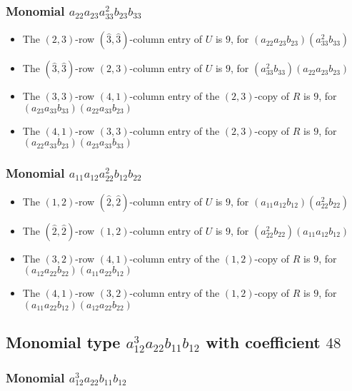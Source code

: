 \documentclass{article}
\begin{document}
\subsubsection{Monomial $ a_{22} a_{23} a_{33}^{2} b_{23} b_{33} $}

\begin{itemize}
\item The $ \left(2, 3\right) $-row $ (\hat{3}, \hat{3}) $-column entry of $U$ is $ 9 $, for $( a_{22} a_{23} b_{23} )( a_{33}^{2} b_{33} )$ 
\item The $(\hat{3}, \hat{3})$-row $ \left(2, 3\right) $-column entry of $U$ is $ 9 $, for $( a_{33}^{2} b_{33} )( a_{22} a_{23} b_{23} )$ 
\item The $(3, 3)$-row $(4, 1)$-column entry of the $ \left(2, 3\right) $-copy of $R$ is $ 9 $, for $( a_{23} a_{33} b_{33} )( a_{22} a_{33} b_{23} )$ 
\item The $(4, 1)$-row $(3, 3)$-column entry of the $ \left(2, 3\right) $-copy of $R$ is $ 9 $, for $( a_{22} a_{33} b_{23} )( a_{23} a_{33} b_{33} )$ 
\end{itemize}
\subsubsection{Monomial $ a_{11} a_{12} a_{22}^{2} b_{12} b_{22} $}

\begin{itemize}
\item The $ \left(1, 2\right) $-row $ (\hat{2}, \hat{2}) $-column entry of $U$ is $ 9 $, for $( a_{11} a_{12} b_{12} )( a_{22}^{2} b_{22} )$ 
\item The $(\hat{2}, \hat{2})$-row $ \left(1, 2\right) $-column entry of $U$ is $ 9 $, for $( a_{22}^{2} b_{22} )( a_{11} a_{12} b_{12} )$ 
\item The $(3, 2)$-row $(4, 1)$-column entry of the $ \left(1, 2\right) $-copy of $R$ is $ 9 $, for $( a_{12} a_{22} b_{22} )( a_{11} a_{22} b_{12} )$ 
\item The $(4, 1)$-row $(3, 2)$-column entry of the $ \left(1, 2\right) $-copy of $R$ is $ 9 $, for $( a_{11} a_{22} b_{12} )( a_{12} a_{22} b_{22} )$ 
\end{itemize}
\subsection{Monomial type $ a_{12}^{3} a_{22} b_{11} b_{12} $ with coefficient $ 48 $}

\subsubsection{Monomial $ a_{12}^{3} a_{22} b_{11} b_{12} $}
\end{document}
